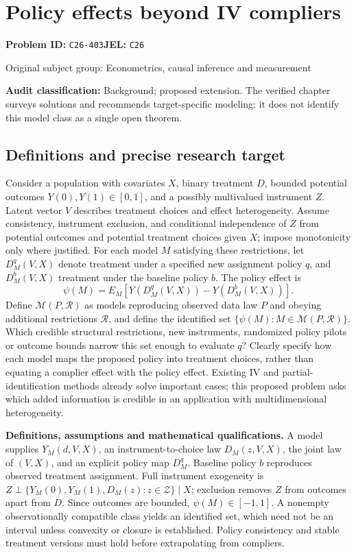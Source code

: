 \documentclass[11pt,a4paper]{article}
\begin{document}
\section*{Policy effects beyond IV compliers}
\textbf{Problem ID:} \texttt{C26-403}\quad \textbf{JEL:} \texttt{C26}\par
\label{problem:OP-0424}
{\sffamily\small\color{muted}Original subject group: Econometrics, causal inference and measurement\par}
\label{definitions:problem:30007706}
\textbf{Audit classification:} Background; proposed extension. The verified chapter surveys solutions and recommends target-specific modeling; it does not identify this model class as a single open theorem.
\subsection*{Definitions and precise research target}
Consider a population with covariates \(X\), binary treatment \(D\), bounded potential outcomes \(Y(0),Y(1)\in[0,1]\), and a possibly multivalued instrument \(Z\). Latent vector \(V\) describes treatment choices and effect heterogeneity. Assume consistency, instrument exclusion, and conditional independence of \(Z\) from potential outcomes and potential treatment choices given \(X\); impose monotonicity only where justified. For each model \(M\) satisfying these restrictions, let \(D_M^q(V,X)\) denote treatment under a specified new assignment policy \(q\), and \(D_M^b(V,X)\) treatment under the baseline policy \(b\). The policy effect is
\[
\psi(M)=E_M[Y(D_M^q(V,X))-Y(D_M^b(V,X))].
\]
Define \(\mathcal M(P,\mathcal R)\) as models reproducing observed data law \(P\) and obeying additional restrictions \(\mathcal R\), and define the identified set \(\{\psi(M):M\in\mathcal M(P,\mathcal R)\}\). Which credible structural restrictions, new instruments, randomized policy pilots or outcome bounds narrow this set enough to evaluate \(q\)? Clearly specify how each model maps the proposed policy into treatment choices, rather than equating a complier effect with the policy effect. Existing IV and partial-identification methods already solve important cases; this proposed problem asks which added information is credible in an application with multidimensional heterogeneity.

\textbf{Definitions, assumptions and mathematical qualifications.} A model supplies \(Y_M(d,V,X)\), an instrument-to-choice law \(D_M(z,V,X)\), the joint law of \((V,X)\), and an explicit policy map \(D_M^q\). Baseline policy \(b\) reproduces observed treatment assignment. Full instrument exogeneity is \(Z\perp\{Y_M(0),Y_M(1),D_M(z):z\in\mathcal Z\}\mid X\); exclusion removes \(Z\) from outcomes apart from \(D\). Since outcomes are bounded, \(\psi(M)\in[-1,1]\). A nonempty observationally compatible class yields an identified set, which need not be an interval unless convexity or closure is established. Policy consistency and stable treatment versions must hold before extrapolating from compliers.
\end{document}
